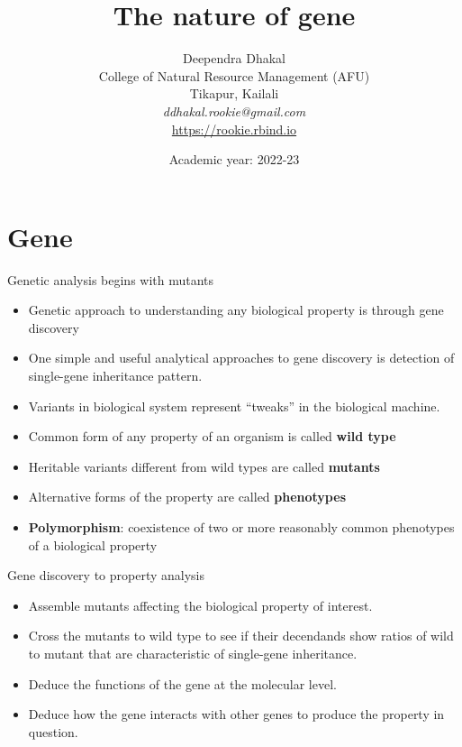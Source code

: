 \documentclass[11pt,dvipsnames,ignorenonframetext,aspectratio=169]{beamer}
\title[]{The nature of gene}
\author[
        Deependra Dhakal\\
College of Natural Resource Management (AFU)\\
Tikapur, Kailali\\
\textit{ddhakal.rookie@gmail.com}\\
\url{https://rookie.rbind.io}
    ]{Deependra Dhakal\\
College of Natural Resource Management (AFU)\\
Tikapur, Kailali\\
\textit{ddhakal.rookie@gmail.com}\\
\url{https://rookie.rbind.io}}
\date[
      Academic year: 2022-23
  ]{
      Academic year: 2022-23
        }
\providecommand{\tightlist}{%
  \setlength{\itemsep}{0pt}\setlength{\parskip}{0pt}}
\begin{document}
  \begin{frame}[plain]
  \titlepage
  \end{frame}



\hypertarget{gene}{%
\section{Gene}\label{gene}}

\begin{frame}{Genetic analysis begins with mutants}
\protect\hypertarget{genetic-analysis-begins-with-mutants}{}
\begin{itemize}
\tightlist
\item
  Genetic approach to understanding any biological property is through
  gene discovery
\item
  One simple and useful analytical approaches to gene discovery is
  detection of single-gene inheritance pattern.
\item
  Variants in biological system represent ``tweaks'' in the biological
  machine.
\item
  Common form of any property of an organism is called \textbf{wild
  type}
\item
  Heritable variants different from wild types are called
  \textbf{mutants}
\item
  Alternative forms of the property are called \textbf{phenotypes}
\item
  \textbf{Polymorphism}: coexistence of two or more reasonably common
  phenotypes of a biological property
\end{itemize}
\end{frame}

\begin{frame}{Gene discovery to property analysis}
\protect\hypertarget{gene-discovery-to-property-analysis}{}
\begin{itemize}
\tightlist
\item
  Assemble mutants affecting the biological property of interest.
\item
  Cross the mutants to wild type to see if their decendands show ratios
  of wild to mutant that are characteristic of single-gene inheritance.
\item
  Deduce the functions of the gene at the molecular level.
\item
  Deduce how the gene interacts with other genes to produce the property
  in question.
\end{itemize}
\end{frame}
\end{document}
